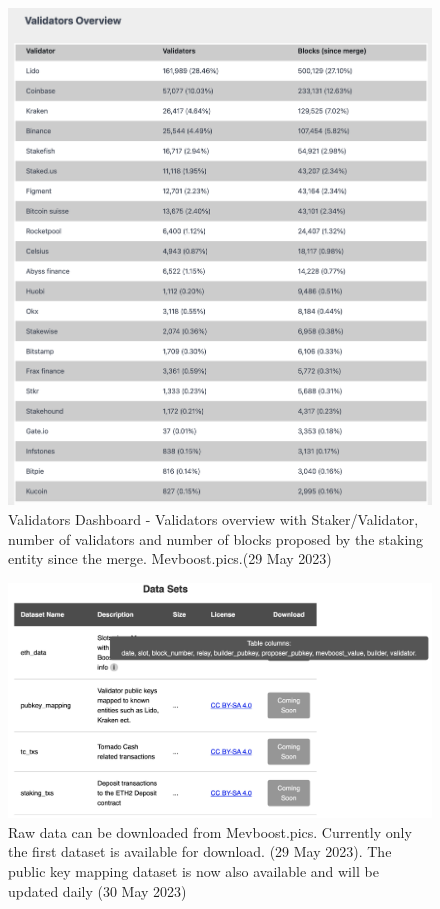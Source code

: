 \documentclass[UTF8]{article}
\begin{document}
\begin{figure}[htbp]
\begin{center}
\includegraphics[width=0.9\linewidth]{images/mevvalidator4}
\caption{Validators Dashboard - Validators overview with Staker/Validator, number of validators and number of blocks proposed by the staking entity since the merge. Mevboost.pics.(29 May 2023)}
\label{fig:mevvalidator4}
\end{center}
\end{figure}

\begin{figure}[htbp]
\begin{center}
\includegraphics[width=0.9\linewidth]{images/mevboostrawdata}
\caption{Raw data can be downloaded from Mevboost.pics. Currently only the first dataset is available for download. (29 May 2023). The public key mapping dataset is now also available and will be updated daily (30 May 2023)}
\label{fig:mevboostrawdata}
\end{center}
\end{figure}
\end{document}
